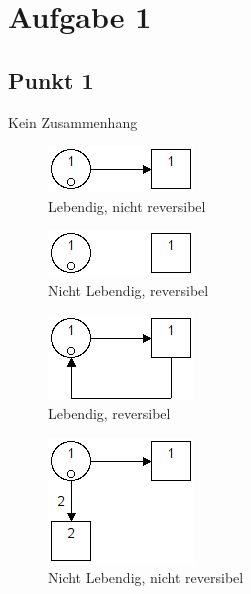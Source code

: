 \documentclass[10pt]{scrartcl}
\author{André Harms, Oliver Steenbuck}
\title{\titletext}
\date{06.06.2012}
\begin{document}
\maketitle

\setcounter{tocdepth}{3}
\tableofcontents

	\listoffigures  

\section{Aufgabe 1}
	\subsection{Punkt 1}
				Kein Zusammenhang
				\begin{figure}[H]
    				\centering	
					\includegraphics[scale=0.5]{aufg011.png}		
            		\caption{Lebendig, nicht reversibel}
				\end{figure}
				\begin{figure}[H]
    				\centering	
					\includegraphics[scale=0.5]{aufg012.png}		
            		\caption{Nicht Lebendig, reversibel}
				\end{figure}
				\begin{figure}[H]
    				\centering	
					\includegraphics[scale=0.5]{aufg013.png}		
            		\caption{Lebendig, reversibel}
				\end{figure}
				\begin{figure}[H]
    				\centering	
					\includegraphics[scale=0.5]{aufg014.png}		
            		\caption{Nicht Lebendig, nicht reversibel}
				\end{figure}
				
\end{document}
